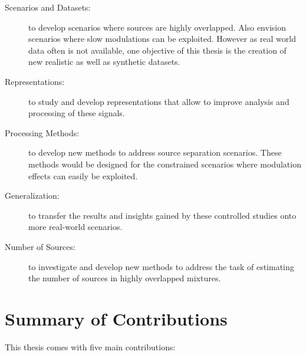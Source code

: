 \begin{description}
  \item[Scenarios and Datasets:] to develop scenarios where sources are highly overlapped. Also envision scenarios where slow modulations can be exploited. 
  However as real world data often is not available, one objective of this thesis is the creation of new realistic as well as synthetic datasets.
  \item[Representations:] to study and develop representations that allow to improve analysis and processing of these signals.
  \item[Processing Methods:] to develop new methods to address source separation scenarios. These methods would be designed for the constrained scenarios where modulation effects can easily be exploited.
  \item[Generalization:] to transfer the results and insights gained by these controlled studies onto more real-world scenarios.
  \item[Number of Sources:] to investigate and develop new methods to address the task of estimating the number of sources in highly overlapped mixtures.
\end{description}




\clearpage
\section{Summary of Contributions}

This thesis comes with five main contributions:

